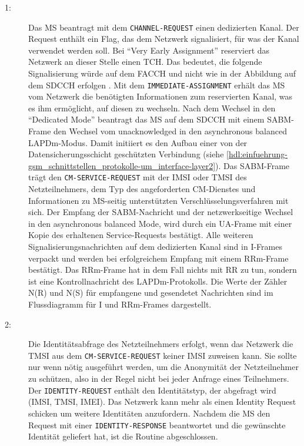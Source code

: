 \begin{description}
\item[1:] Das \ac{MS} beantragt mit dem \texttt{CHANNEL-REQUEST}  einen dedizierten Kanal. Der Request enthält ein Flag, das dem Netzwerk signalisiert, für was der Kanal verwendet werden soll. Bei "`Very Early Assignment"' reserviert das Netzwerk an dieser Stelle einen \ac{TCH}. Das bedeutet, die folgende Signalisierung würde auf dem \ac{FACCH} und nicht wie in der Abbildung auf dem \ac{SDCCH} erfolgen . Mit dem \texttt{IMMEDIATE-ASSIGNMENT}  erhält das \ac{MS} vom Netzwerk die benötigten Informationen zum reservierten Kanal, was es ihm ermöglicht, auf diesen zu wechseln. Nach dem Wechsel in den "`Dedicated Mode"' beantragt das \ac{MS} auf dem \ac{SDCCH} mit einem \ac{SABM}-Frame den Wechsel vom unacknowledged in den asynchronous balanced \ac{LAPDm}-Modus. Damit initiiert es den Aufbau einer von der Datensicherungsschicht geschützten Verbindung (siehe \autoref{hdl:einfuehrung-gsm_schnittstellen_protokolle-um_interface-layer2}). Das \ac{SABM}-Frame trägt den \texttt{CM-SERVICE-REQUEST}  mit der \ac{IMSI} oder \ac{TMSI} des Netzteilnehmers, dem Typ des angeforderten \ac{CM}-Dienstes und Informationen zu \ac{MS}-seitig unterstützten Verschlüsselungsverfahren mit sich. Der Empfang der \ac{SABM}-Nachricht und der netzwerkseitige Wechsel in den asynchronous balanced Mode, wird durch ein \ac{UA}-Frame mit einer Kopie des erhaltenen Service-Requests bestätigt. Alle weiteren Signalisierungsnachrichten auf dem dedizierten Kanal sind in \ac{I}-Frames verpackt und werden bei erfolgreichem Empfang mit einem \ac{RRm}-Frame bestätigt. Das \ac{RRm}-Frame hat in dem Fall nichts mit \acl{RR} zu tun, sondern ist eine Kontrollnachricht des \ac{LAPDm}-Protokolls. Die Werte der Zähler \ac{N(R)} und \ac{N(S)} für empfangene und gesendetet Nachrichten sind im Flussdiagramm für \ac{I} und \ac{RRm}-Frames dargestellt.
\item[2:] Die Identitätsabfrage des Netzteilnehmers \citep[Kap. 4.3.3]{3gpp:24.008} erfolgt, wenn das Netzwerk die \ac{TMSI} aus dem \texttt{CM-SERVICE-REQUEST} keiner \ac{IMSI} zuweisen kann. Sie sollte nur wenn nötig ausgeführt werden, um die Anonymität der Netzteilnehmer zu schützen, also in der Regel nicht bei jeder Anfrage eines Teilnehmers. Der \texttt{IDENTITY-REQUEST} \citep[Kap. 9.2.10]{3gpp:24.008} enthält den Identitätstyp, der abgefragt wird (\ac{IMSI}, \ac{TMSI}, \ac{IMEI}). Das Netzwerk kann mehr als einen Identity Request schicken um weitere Identitäten anzufordern. Nachdem die \ac{MS} den Request mit einer \texttt{IDENTITY-RESPONSE} \citep[Kap. 9.2.11]{3gpp:24.008} beantwortet und die gewünschte Identität geliefert hat, ist die Routine abgeschlossen.

\end{description}
